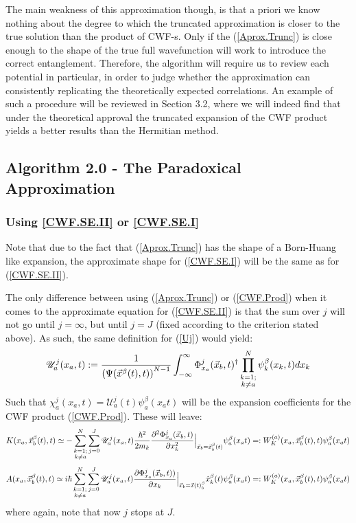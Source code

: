 \documentclass[11pt, a4paper]{article} %
\newcommand{\U}{\mathscr{U}}
\begin{document}
The main weakness of this approximation though, is that a priori we know nothing about the degree to which the truncated approximation is closer to the true solution than the product of CWF-s. Only if the (\ref{Aprox.Trunc}) is close enough to the shape of the true full wavefunction will work to introduce the correct entanglement. Therefore, the algorithm will require us to review each potential in particular, in order to judge whether the approximation can consistently replicating the theoretically expected correlations. An example of such a procedure will be reviewed in Section 3.2, where we will indeed find that under the theoretical approval the truncated expansion of the CWF product yields a better results than the Hermitian method.\vspace{-0.3cm}

\subsection{Algorithm 2.0 - The Paradoxical Approximation }
\subsubsection{Using \ref{CWF.SE.II} or \ref{CWF.SE.I}}
Note that due to the fact that (\ref{Aprox.Trunc}) has the shape of a Born-Huang like expansion, the approximate shape for (\ref{CWF.SE.I}) will be the same as for (\ref{CWF.SE.II}).

The only difference between using (\ref{Aprox.Trunc}) or (\ref{CWF.Prod}) when it comes to the approximate equation for (\ref{CWF.SE.II}) is that the sum over $j$ will not go until $j=\infty$, but until $j=J$ (fixed according to the criterion stated above). As such, the same definition for (\ref{Uj}) would yield:\vspace{-0.1cm}
$$
\U^j_a(x_a, t):=\frac{1}{ \qty(\Psi(\vec{x}^\beta(t),t))^{N-1}} \int_{-\infty}^\infty \Phi_{x_a}^j(\vec{x}_b,t)^\dagger \prod_{\substack{k=1; \\ k\neq a}}^{N} \psi^\beta_k(x_k,t) dx_k \vspace{-0.1cm}
$$
Such that $\chi_a^j(x_a,t)= \U^j_a(t)\psi_a^\beta(x_a t)$ will be the expansion coefficients for the CWF product (\ref{CWF.Prod}). These will leave:
$$
K(x_a, \vec{x}_b^\beta(t), t) \simeq - \sum_{\substack{k=1; \\ k\neq a}}^{N} \sum_{j=0}^J \U^j_a(x_a,t) \frac{\hbar^2}{2m_k} \pdv[2]{ \Phi_{x_a}^j(\vec{x}_b,t)}{x_k}\Big\rvert_{\vec{x}_b=\vec{x}_b^\beta(t)}\psi_a^\beta(x_a t)=:W_K^{(a)}(x_a, \vec{x}_b^\beta (t),t)\psi_a^\beta(x_a t)
$$
$$
A(x_a, \vec{x}_b^\beta(t), t) \simeq i \hbar \sum_{\substack{k=1; \\ k\neq a}}^{N} \sum_{j=0}^J \U^j_a(x_a,t) \pdv{ \Phi_{x_a}^j(\vec{x}_b,t))}{x_k}\Big\rvert_{\vec{x}_b=\vec{x}(t)_b^\beta} \dot{x}_k^\beta(t)\psi_a^\beta(x_a t)=:W_K^{(a)}(x_a, \vec{x}_b^\beta (t),t)\psi_a^\beta(x_a t)
$$
where again, note that now $j$ stops at $J$. 
\end{document}
